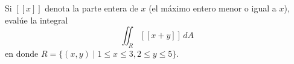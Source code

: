 \item Si $[[x]]$ denota la parte entera de $x$ (el máximo entero menor o igual a $x$), evalúe la integral
    \[ \iint_R [[x + y]] \, dA \]
    en donde $R = \{(x, y) \mid 1 \le x \le 3, 2 \le y \le 5\}$.
